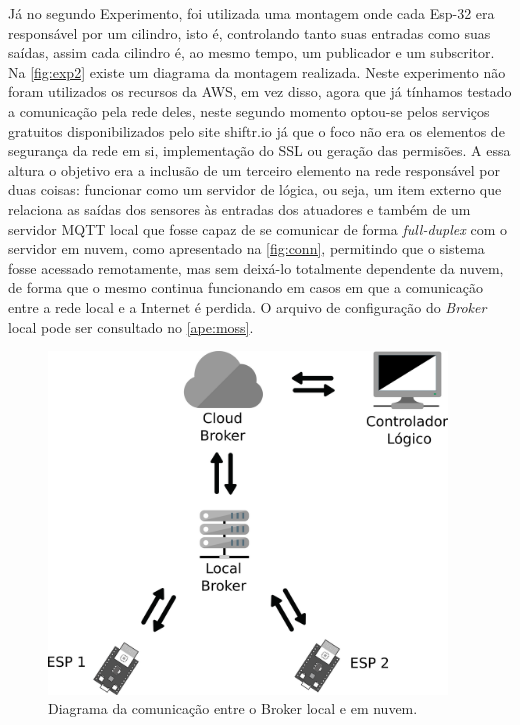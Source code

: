 Já no segundo Experimento, foi utilizada uma montagem onde cada Esp-32 era responsável por um cilindro, isto é, 
controlando tanto suas entradas como suas saídas, assim cada cilindro é, ao mesmo tempo, um publicador e um subscritor.
Na \autoref{fig:exp2} existe um diagrama da montagem realizada. Neste experimento não foram utilizados os recursos da AWS,
em vez disso, agora que já tínhamos testado a comunicação
pela rede deles, neste segundo momento optou-se pelos serviços gratuitos disponibilizados pelo site shiftr.io já que o foco 
não era os elementos de segurança da rede em si, implementação do \ac{SSL} ou geração das permisões. A essa altura o
objetivo era a inclusão de um terceiro elemento na rede responsável por duas coisas: funcionar como um servidor de lógica,
ou seja, um item externo que relaciona as saídas dos sensores às entradas dos atuadores e também de um servidor \ac{MQTT} local
que fosse capaz de se comunicar de forma \textit{full-duplex} com o servidor em nuvem, como apresentado na 
\autoref{fig:conn}, permitindo que o sistema fosse acessado 
remotamente, mas sem deixá-lo totalmente dependente da nuvem, de forma que o mesmo continua funcionando em casos em que 
a comunicação entre a rede local e a Internet é perdida. O arquivo de configuração do \textit{Broker} local pode ser consultado
no \autoref{ape:moss}.

\begin{figure}[htb]
    \begin{center}
	    \includegraphics[width=300pt]{figs/diag_conn.png}
	\end{center}
	\caption{\label{fig:conn} Diagrama da comunicação entre o Broker local e em nuvem.} 
\end{figure}


